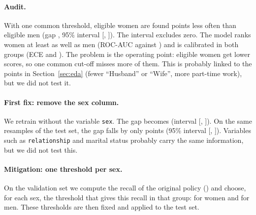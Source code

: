 \documentclass[11pt,a4paper]{article}
\newcommand{\tablefile}[1]{\begin{center}\small\resizebox{\linewidth}{!}{}\end{center}}
\begin{document}
\paragraph{Audit.} With one common threshold, eligible women are found \gapPointsBefore{} points less often than eligible men (gap \gapBefore, 95\% interval [\gapLowBefore, \gapHighBefore]). The interval excludes zero. The model ranks women at least as well as men (ROC-AUC \rocFemale{} against \rocMale) and is calibrated in both groups (ECE \eceFemale{} and \eceMale). The problem is the operating point: eligible women get lower scores, so one common cut-off misses more of them. This is probably linked to the points in Section~\ref{sec:eda} (fewer ``Husband'' or ``Wife'', more part-time work), but we did not test it.

\paragraph{First fix: remove the sex column.} We retrain without the variable \texttt{sex}. The gap becomes \gapNoSex{} (interval [\gapLowNoSex, \gapHighNoSex]). On the same resamples of the test set, the gap falls by only \pairedNoSex{} points (95\% interval [\pairedNoSexLow, \pairedNoSexHigh]). Variables such as \texttt{relationship} and marital status probably carry the same information, but we did not test this.

\paragraph{Mitigation: one threshold per sex.} On the validation set we compute the recall of the original policy (\targetTpr) and choose, for each sex, the threshold that gives this recall in that group: \thrFemaleAfter{} for women and \thrMaleAfter{} for men. These thresholds are then fixed and applied to the test set.

\tablefile{table_fair_policies.tex}
\label{tab:fair}
\end{document}
